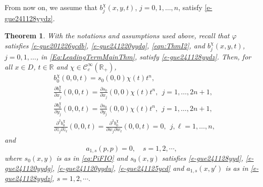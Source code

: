 \documentclass[12pt]{amsart}
\newtheorem{theorem}{Theorem}[section]
\theoremstyle{definition}
\theoremstyle{named}
\numberwithin{equation}{subsection}
\newcommand{\ol}{\overline}
\newcommand{\R}{\mathbb{R}}
\newcommand{\pr}{\partial}
\begin{document}
From now on, we assume that $b^\chi_j(x,y,t)$, $j=0,1,\ldots,n$, satisfy \eqref{e-gue241128yydz}. 

\begin{theorem}\label{thm:s1_indep_of_deri_of_chi}
    With the notations and assumptions used above, recall that $\varphi$ satisfies \eqref{e-gue201226ycdb}, \eqref{e-gue241220yydq}, \eqref{eqn:ThmI2}, and  $b^\chi_j(x,y,t)$, $j=0,1,\ldots$, in \eqref{Eq:LeadingTermMainThm}, satisfy \eqref{e-gue241128yydz}.
    Then, for all $x\in D$, $t\in\mathbb R$ and \(\chi\in\mathscr{C}_c^\infty(\R_+)\), 
    \begin{equation}\label{eqn:ThmIII4}
    \begin{split}
    &b^\chi_0(0,0,t)=s_0(0,0)\chi(t)t^n,\\
&\frac{\pr b^\chi_0}{\pr x_j}(0,0,t)=\frac{\pr s_0}{\pr x_j}(0,0)\chi(t)t^n,\ \ j=1,\ldots,2n+1,\\
&\frac{\pr b^\chi_0}{\pr y_j}(0,0,t)=\frac{\pr s_0}{\pr y_j}(0,0)\chi(t)t^n,\ \ j=1,\ldots,2n+1,\\
&\frac{\pr^2b^\chi_0}{\pr\ol z_j\pr z_\ell}(0,0,t)=\frac{\pr^2b^\chi_0}{\pr\ol w_j\pr w_\ell}(0,0,t)=0,\ \ j, \ell=1,\ldots,n,
\end{split}
    \end{equation}
and
    \begin{equation}\label{eqn:ThmIII5}
        a_{1,s}(p,p)=0,\quad s=1,2,\cdots,
    \end{equation}
    where $s_0(x,y)$ is as in \eqref{eq:PiFIO} 
    and $s_0(x,y)$ satisfies \eqref{e-gue241128yyd}, 
    \eqref{e-gue241120yydg}, \eqref{e-gue241120yydu}, \eqref{e-gue241125ycd} and $a_{1,s}(x,y')$ is as in \eqref{e-gue241128yydz}, $s=1,2,\cdots.$
\end{theorem}
\end{document}
